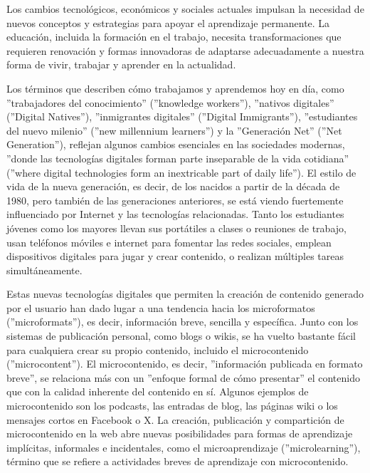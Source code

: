 Los cambios tecnológicos, económicos y sociales actuales impulsan la necesidad
de nuevos conceptos y estrategias para apoyar el aprendizaje permanente. La
educación, incluida la formación en el trabajo, necesita transformaciones que
requieren renovación y formas innovadoras de adaptarse adecuadamente a nuestra
forma de vivir, trabajar y aprender en la actualidad.
\cite{article:microlearning_buchem}

Los términos que describen cómo trabajamos y aprendemos hoy en día, como ''trabajadores
del conocimiento'' (''knowledge workers''), ''nativos digitales'' (''Digital
Natives''), ''inmigrantes digitales'' (''Digital Immigrants''), ''estudiantes del
nuevo milenio'' (''new millennium learners'') y la ''Generación Net'' (''Net
Generation''), reflejan algunos cambios esenciales en las sociedades modernas,
''donde las tecnologías digitales forman parte inseparable de la vida cotidiana''
(''where digital technologies form an inextricable part of daily life''). El
estilo de vida de la nueva generación, es decir, de los nacidos a partir de la
década de 1980, pero también de las generaciones anteriores, se está viendo
fuertemente influenciado por Internet y las tecnologías relacionadas. Tanto los
estudiantes jóvenes como los mayores llevan sus portátiles a clases o reuniones
de trabajo, usan teléfonos móviles e internet para fomentar las redes sociales,
emplean dispositivos digitales para jugar y crear contenido, o realizan
múltiples tareas simultáneamente.
\cite{article:microlearning_buchem}

Estas nuevas tecnologías digitales que permiten la creación de contenido
generado por el usuario han dado lugar a una tendencia hacia los microformatos
(''microformats''), es decir, información breve, sencilla y específica. Junto con
los sistemas de publicación personal, como blogs o wikis, se ha vuelto bastante
fácil para cualquiera crear su propio contenido, incluido el microcontenido
(''microcontent''). El microcontenido, es decir, ''información publicada en formato
breve'', se relaciona más con un ''enfoque formal de cómo presentar'' el contenido
que con la calidad inherente del contenido en sí. Algunos ejemplos de
microcontenido son los podcasts, las entradas de blog, las páginas wiki o los
mensajes cortos en Facebook o X. La creación, publicación y compartición de
microcontenido en la web abre nuevas posibilidades para formas de aprendizaje
implícitas, informales e incidentales, como el microaprendizaje
(''microlearning''), término que se refiere a actividades breves de aprendizaje
con microcontenido.
\cite{article:microlearning_buchem}